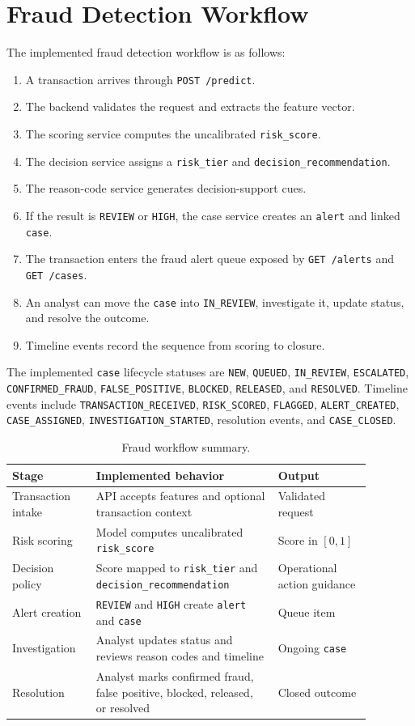 \documentclass[11pt]{article}
\newcommand{\code}[1]{\texttt{#1}}
\begin{document}
\section{Fraud Detection Workflow}
The implemented fraud detection workflow is as follows:
\begin{enumerate}[leftmargin=1.5em]
  \item A transaction arrives through \code{POST /predict}.
  \item The backend validates the request and extracts the feature vector.
  \item The scoring service computes the uncalibrated \code{risk_score}.
  \item The decision service assigns a \code{risk_tier} and \code{decision_recommendation}.
  \item The reason-code service generates decision-support cues.
  \item If the result is \code{REVIEW} or \code{HIGH}, the case service creates an \code{alert} and linked \code{case}.
  \item The transaction enters the fraud alert queue exposed by \code{GET /alerts} and \code{GET /cases}.
  \item An analyst can move the \code{case} into \code{IN_REVIEW}, investigate it, update status, and resolve the outcome.
  \item Timeline events record the sequence from scoring to closure.
\end{enumerate}

The implemented \code{case} lifecycle statuses are \code{NEW}, \code{QUEUED}, \code{IN_REVIEW}, \code{ESCALATED}, \code{CONFIRMED_FRAUD}, \code{FALSE_POSITIVE}, \code{BLOCKED}, \code{RELEASED}, and \code{RESOLVED}. Timeline events include \code{TRANSACTION_RECEIVED}, \code{RISK_SCORED}, \code{FLAGGED}, \code{ALERT_CREATED}, \code{CASE_ASSIGNED}, \code{INVESTIGATION_STARTED}, resolution events, and \code{CASE_CLOSED}.

\begin{table}[H]
\centering
\begin{tabular}{p{0.2\linewidth}p{0.45\linewidth}p{0.23\linewidth}}
\toprule
Stage & Implemented behavior & Output \\
\midrule
Transaction intake & API accepts features and optional transaction context & Validated request \\
Risk scoring & Model computes uncalibrated \code{risk_score} & Score in \([0,1]\) \\
Decision policy & Score mapped to \code{risk_tier} and \code{decision_recommendation} & Operational action guidance \\
Alert creation & \code{REVIEW} and \code{HIGH} create \code{alert} and \code{case} & Queue item \\
Investigation & Analyst updates status and reviews reason codes and timeline & Ongoing \code{case} \\
Resolution & Analyst marks confirmed fraud, false positive, blocked, released, or resolved & Closed outcome \\
\bottomrule
\end{tabular}
\caption{Fraud workflow summary.}
\end{table}
\end{document}
